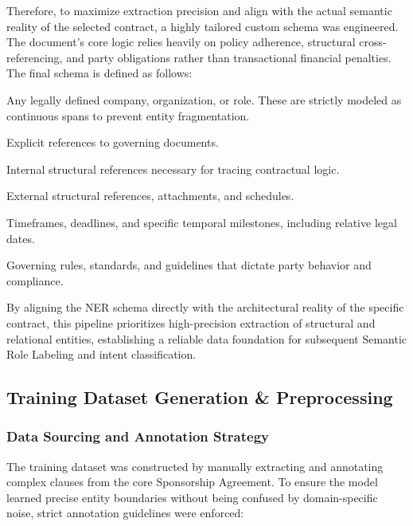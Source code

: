 \documentclass[twoside,final]{hcmut-report}
\begin{document}
\medskip

Therefore, to maximize extraction precision and align with the actual semantic reality of the selected contract, a highly tailored custom schema was engineered. The document's core logic relies heavily on policy adherence, structural cross-referencing, and party obligations rather than transactional financial penalties. The final schema is defined as follows:

\begin{description}[leftmargin=3.5cm, style=nextline]
  \item[PARTY:] Any legally defined company, organization, or role. These are strictly modeled as continuous spans to prevent entity fragmentation.
  \item[AGREEMENT:] Explicit references to governing documents.
  \item[SECTION:] Internal structural references necessary for tracing contractual logic.
  \item[EXHIBIT:] External structural references, attachments, and schedules.
  \item[DATE:] Timeframes, deadlines, and specific temporal milestones, including relative legal dates.
  \item[POLICY:] Governing rules, standards, and guidelines that dictate party behavior and compliance.
\end{description}

\medskip

By aligning the NER schema directly with the architectural reality of the specific contract, this pipeline prioritizes high-precision extraction of structural and relational entities, establishing a reliable data foundation for subsequent Semantic Role Labeling and intent classification.

\subsection{Training Dataset Generation \& Preprocessing}
\subsubsection{Data Sourcing and Annotation Strategy}
The training dataset was constructed by manually extracting and annotating complex clauses from the core Sponsorship Agreement. To ensure the model learned precise entity boundaries without being confused by domain-specific noise, strict annotation guidelines were enforced:
\end{document}

